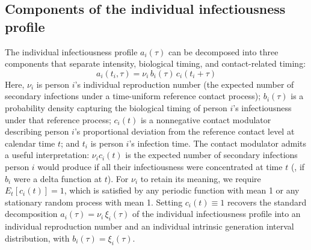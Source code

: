 
\subsection{Components of the individual infectiousness profile}

The individual infectiousness profile $a_i(\tau)$ can be decomposed into three components that separate intensity, biological timing, and contact-related timing:
%
\begin{equation}
    a_i(t_i, \tau) = \nu_i \, b_i(\tau) \, c_i(t_i + \tau)
    \label{eq:abc}
\end{equation}
%
Here, $\nu_i$ is person $i$'s individual reproduction number (the expected number of secondary infections under a time-uniform reference contact process); $b_i(\tau)$ is a probability density capturing the biological timing of person $i$'s infectiousness under that reference process; $c_i(t)$ is a nonnegative contact modulator describing person $i$'s proportional deviation from the reference contact level at calendar time $t$; and $t_i$ is person $i$'s infection time. The contact modulator admits a useful interpretation: $\nu_i c_i(t)$ is the expected number of secondary infections person $i$ would produce if all their infectiousness were concentrated at time $t$ (\ie, if $b_i$ were a delta function at $t$). For $\nu_i$ to retain its meaning, we require $E_t[c_i(t)] = 1$, which is satisfied by any periodic function with mean 1 or any stationary random process with mean 1. Setting $c_i(t) \equiv 1$ recovers the standard decomposition $a_i(\tau) = \nu_i \, \xi_i(\tau)$ of the individual infectiousness profile into an individual reproduction number and an individual intrinsic generation interval distribution, with $b_i(\tau) = \xi_i(\tau)$.

